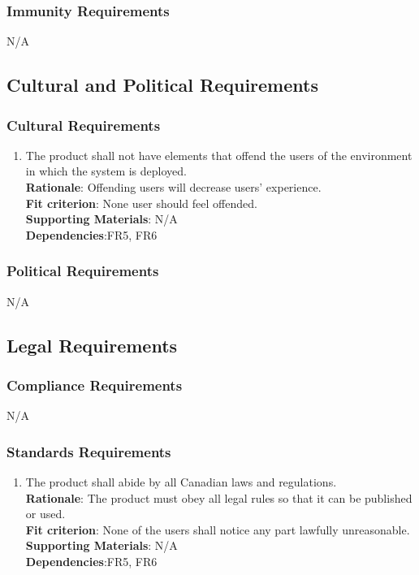 \documentclass{article}
\begin{document}
\subsubsection{Immunity Requirements}
N/A
\subsection{Cultural and Political Requirements}
\subsubsection{Cultural Requirements}
\begin{enumerate}[CP1.1]
    \item The product shall not have elements that offend the users of the environment in which the system is deployed.\\
    \textbf{Rationale}: Offending users will decrease users' experience.\\
    \textbf{Fit criterion}: None user should feel offended.\\
\textbf{Supporting Materials}: N/A\\
\textbf{Dependencies}:FR5, FR6\\

\end{enumerate}
\subsubsection{Political Requirements}
N/A
\subsection{Legal Requirements}
\subsubsection{Compliance Requirements}
N/A
\subsubsection{Standards Requirements}
\begin{enumerate}[LR2.1]
    \item The product shall abide by all Canadian laws and regulations.\\
    \textbf{Rationale}: The product must obey all legal rules so that it can be published or used.\\
    \textbf{Fit criterion}: None of the users shall notice any part lawfully unreasonable.\\
\textbf{Supporting Materials}: N/A\\
\textbf{Dependencies}:FR5, FR6\\
    
  
\end{enumerate}
\end{document}
